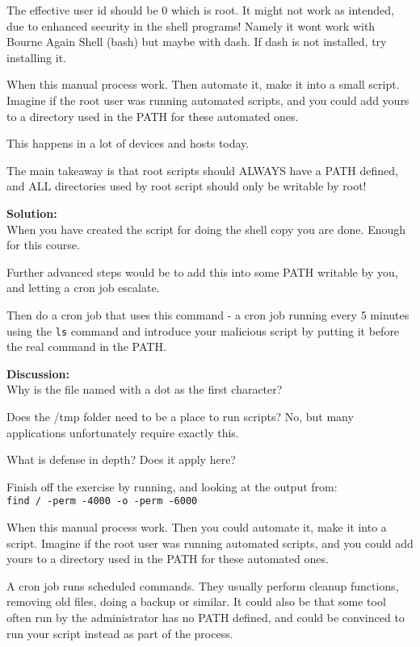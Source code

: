\documentclass[a4paper,11pt,notitlepage]{report}
\begin{document}
The effective user id should be 0 which is root. It might not work as intended, due to enhanced security in the shell programs! Namely it wont work with Bourne Again Shell (bash) but maybe with dash. If dash is not installed, try installing it.

When this manual process work. Then automate it, make it into a small script. Imagine if the root user was running automated scripts, and you could add yours to a directory used in the PATH for these automated ones.

This happens in a lot of devices and hosts today.

The main takeaway is that root scripts should ALWAYS have a PATH defined, and ALL directories used by root script should only be writable by root!

{\bf Solution:}\\
When you have created the script for doing the shell copy you are done. Enough for this course.

Further advanced steps would be to add this into some PATH writable by you, and letting a cron job escalate.

Then do a cron job that uses this command - a cron job running every 5 minutes using the \verb+ls+ command and introduce your malicious script by putting it before the real command in the PATH.



{\bf Discussion:}\\
Why is the file named with a dot as the first character?

Does the /tmp folder need to be a place to run scripts? No, but many applications unfortunately require exactly this.

What is defense in depth? Does it apply here?

Finish off the exercise by running, and looking at the output from:\\
\verb+find / -perm -4000 -o -perm -6000+

When this manual process work. Then you could automate it, make it into a script. Imagine if the root user was running automated scripts, and you could add yours to a directory used in the PATH for these automated ones.

A cron job runs scheduled commands. They usually perform cleanup functions, removing old files, doing a backup or similar. It could also be that some tool often run by the administrator has no PATH defined, and could be convinced to run your script instead as part of the process.
\end{document}
